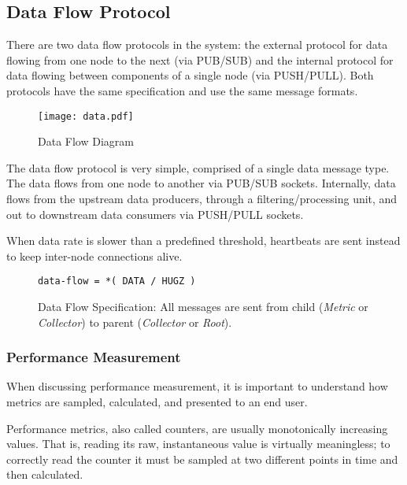 \subsection{Data Flow Protocol}
\label{proto_data}

There are two data flow protocols in the \dcamp system: the external protocol for data flowing from one node to the next
(via PUB/SUB) and the internal protocol for data flowing between components of a single node (via PUSH/PULL). Both
protocols have the same specification and use the same message formats.

\begin{figure}[H]
    \centering
    \texttt{[image: data.pdf]}
    \caption{Data Flow Diagram}
    \label{fig:proto_data_image}
\end{figure}

The \dcamp data flow protocol is very simple, comprised of a single data message type. The data flows from one node to
another via PUB/SUB sockets. Internally, data flows from the upstream data producers, through a filtering/processing
unit, and out to downstream data consumers via PUSH/PULL sockets.

When data rate is slower than a predefined threshold, heartbeats are sent instead to keep inter-node connections alive.

\begin{figure}[H]
\vspace{+10pt}
\begin{verbatim}
data-flow = *( DATA / HUGZ )
\end{verbatim}
\vspace{-5pt}
\caption[Data Flow Specification]
	{Data Flow Specification: All messages are sent from child (\textit{Metric} or \textit{Collector}) to parent
	 (\textit{Collector} or \textit{Root}).}
\label{fig:proto_data_spec}
\end{figure}

\subsubsection{Performance Measurement}

When discussing performance measurement, it is important to understand how metrics are sampled, calculated, and
presented to an end user.

Performance metrics, also called counters, are usually monotonically increasing values. That is, reading its raw,
instantaneous value is virtually meaningless; to correctly read the counter it must be sampled at two different points
in time and then calculated.

